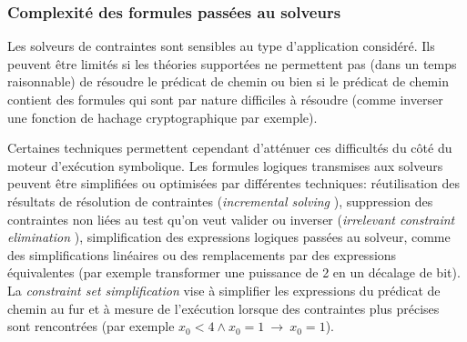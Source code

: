             \subsubsection{Complexité des formules passées au solveurs}
                
                Les solveurs de contraintes sont sensibles au type d'application considéré. Ils peuvent être limités si les théories supportées ne permettent pas (dans un temps raisonnable) de résoudre le prédicat de chemin ou bien si le prédicat de chemin contient des formules qui sont par nature difficiles à résoudre (comme inverser une fonction de hachage cryptographique par exemple). 
                
                Certaines techniques permettent cependant d'atténuer ces difficultés du côté du moteur d'exécution symbolique. Les formules logiques transmises aux solveurs peuvent être simplifiées ou optimisées par différentes techniques: réutilisation des résultats de résolution de contraintes (\textit{incremental solving} \cite{Sen/SIGSOFT05}),
                suppression des contraintes non liées au test qu'on veut valider ou inverser (\textit{irrelevant constraint elimination} \cite{Cadar/OSDI08}), simplification des expressions logiques passées au solveur, comme des simplifications linéaires ou des remplacements par des expressions équivalentes (par exemple transformer une puissance de 2 en un décalage de bit). La \textit{constraint set simplification} \cite{Cadar/ACM13} vise à simplifier les expressions du prédicat de chemin au fur et à mesure de l'exécution lorsque des contraintes plus précises sont rencontrées (par exemple $x_0 < 4 \wedge x_0 = 1 \: \to \:  x_0 = 1$).
                
